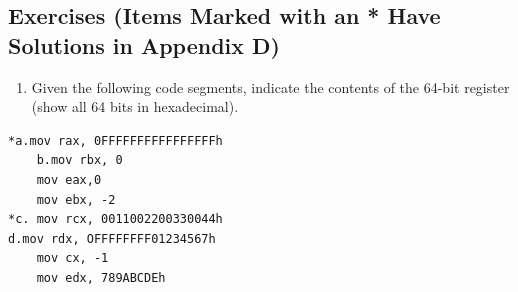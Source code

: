 \documentclass[10pt]{book}
\begin{document}
\subsection{Exercises (Items Marked with an * Have Solutions in Appendix D)}
\begin{enumerate}
  \item Given the following code segments, indicate the contents of the 64-bit register (show all 64 bits in hexadecimal).
\end{enumerate}
\begin{verbatim}
*a.mov rax, 0FFFFFFFFFFFFFFFFh
    b.mov rbx, 0
    mov eax,0
    mov ebx, -2
*c. mov rcx, 0011002200330044h
d.mov rdx, OFFFFFFFF01234567h
    mov cx, -1
    mov edx, 789ABCDEh
\end{verbatim}
\end{document}
